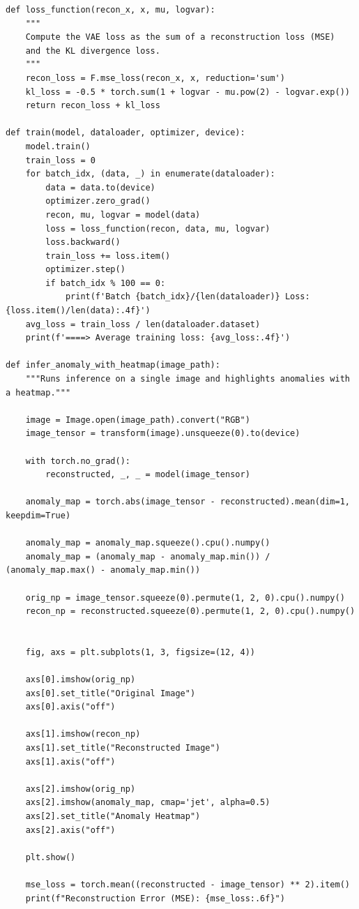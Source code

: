\begin{verbatim}
def loss_function(recon_x, x, mu, logvar):
    """
    Compute the VAE loss as the sum of a reconstruction loss (MSE)
    and the KL divergence loss.
    """
    recon_loss = F.mse_loss(recon_x, x, reduction='sum')
    kl_loss = -0.5 * torch.sum(1 + logvar - mu.pow(2) - logvar.exp())
    return recon_loss + kl_loss

def train(model, dataloader, optimizer, device):
    model.train()
    train_loss = 0
    for batch_idx, (data, _) in enumerate(dataloader):
        data = data.to(device)
        optimizer.zero_grad()
        recon, mu, logvar = model(data)
        loss = loss_function(recon, data, mu, logvar)
        loss.backward()
        train_loss += loss.item()
        optimizer.step()
        if batch_idx % 100 == 0:
            print(f'Batch {batch_idx}/{len(dataloader)} Loss: {loss.item()/len(data):.4f}')
    avg_loss = train_loss / len(dataloader.dataset)
    print(f'====> Average training loss: {avg_loss:.4f}')

def infer_anomaly_with_heatmap(image_path):
    """Runs inference on a single image and highlights anomalies with a heatmap."""

    image = Image.open(image_path).convert("RGB")
    image_tensor = transform(image).unsqueeze(0).to(device)

    with torch.no_grad():
        reconstructed, _, _ = model(image_tensor)

    anomaly_map = torch.abs(image_tensor - reconstructed).mean(dim=1, keepdim=True)

    anomaly_map = anomaly_map.squeeze().cpu().numpy()
    anomaly_map = (anomaly_map - anomaly_map.min()) / (anomaly_map.max() - anomaly_map.min())

    orig_np = image_tensor.squeeze(0).permute(1, 2, 0).cpu().numpy()
    recon_np = reconstructed.squeeze(0).permute(1, 2, 0).cpu().numpy()


    fig, axs = plt.subplots(1, 3, figsize=(12, 4))

    axs[0].imshow(orig_np)
    axs[0].set_title("Original Image")
    axs[0].axis("off")

    axs[1].imshow(recon_np)
    axs[1].set_title("Reconstructed Image")
    axs[1].axis("off")

    axs[2].imshow(orig_np)
    axs[2].imshow(anomaly_map, cmap='jet', alpha=0.5)
    axs[2].set_title("Anomaly Heatmap")
    axs[2].axis("off")

    plt.show()

    mse_loss = torch.mean((reconstructed - image_tensor) ** 2).item()
    print(f"Reconstruction Error (MSE): {mse_loss:.6f}")


\end{verbatim}
